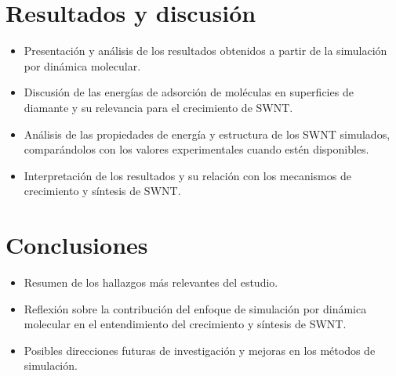 \documentclass[a4paper]{article}
\begin{document}
\section{Resultados y discusión}
\begin{itemize}
\item Presentación y análisis de los resultados obtenidos a partir de la simulación por dinámica molecular.
\item Discusión de las energías de adsorción de moléculas en superficies de diamante y su relevancia para el crecimiento de SWNT.
\item Análisis de las propiedades de energía y estructura de los SWNT simulados, comparándolos con los valores experimentales cuando estén disponibles.
\item Interpretación de los resultados y su relación con los mecanismos de crecimiento y síntesis de SWNT.
\end{itemize}

\section{Conclusiones}
\begin{itemize}
\item Resumen de los hallazgos más relevantes del estudio.
\item Reflexión sobre la contribución del enfoque de simulación por dinámica molecular en el entendimiento del crecimiento y síntesis de SWNT.
\item Posibles direcciones futuras de investigación y mejoras en los métodos de simulación.
\end{itemize}

\printbibliography
\end{document}
